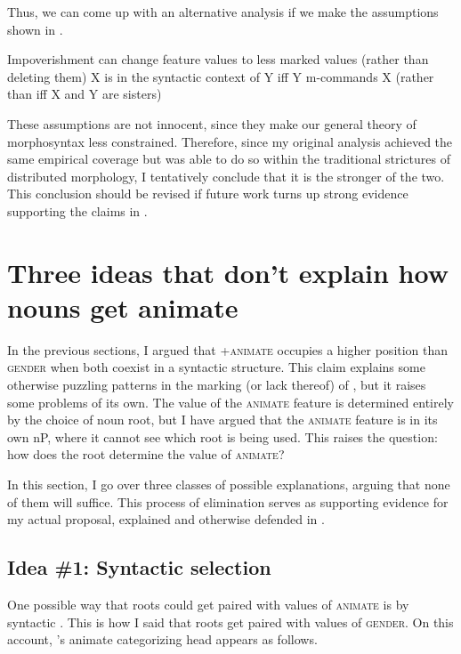 \documentclass[output=paper,newtxmath,modfonts,nonflat,hidelinks]{langsci/langscibook}
\begin{document}
Thus, we can come up with an alternative analysis if we make the assumptions shown in .

\ea\label{ex:pesetsky:deconstrainingassumptions} 
\ea Impoverishment can change feature values to less marked values (rather than deleting them)
\ex X is in the syntactic context of Y iff Y m-commands X (rather than iff X and Y are sisters) \\ \z \z

These assumptions are not innocent, since they make our general theory of morphosyntax less constrained.  Therefore, since my original analysis achieved the same empirical coverage but was able to do so within the traditional strictures of distributed morphology, I tentatively conclude that it is the stronger of the two.  This conclusion should be revised if future work turns up strong evidence supporting the claims in .




 \section{Three ideas that don't explain how nouns get animate} \label{sec:pesetsky:threeideas}

In the previous sections, I argued that +\textsc{animate} occupies a higher position than \textsc{gender} when both coexist in a syntactic structure.  This claim explains some otherwise puzzling patterns in the marking (or lack thereof) of , but it raises some problems of its own.  The value of the \textsc{animate} feature is determined entirely by the choice of noun root, but I have argued that the \textsc{animate} feature is in its own nP, where it cannot see which root is being used.  This raises the question: how does the root determine the value of \textsc{animate}?

In this section, I go over three classes of possible explanations, arguing that none of them will suffice.  This process of elimination serves as supporting evidence for my actual proposal, explained and otherwise defended in .

\subsection{Idea \#1: Syntactic selection} \label{sec:pesetsky:syntacticselectionidea}

One possible way that roots could get paired with values of \textsc{animate} is by syntactic .  This is how I said that roots get paired with values of \textsc{gender}.  On this account, 's animate categorizing head appears as follows.
\end{document}
